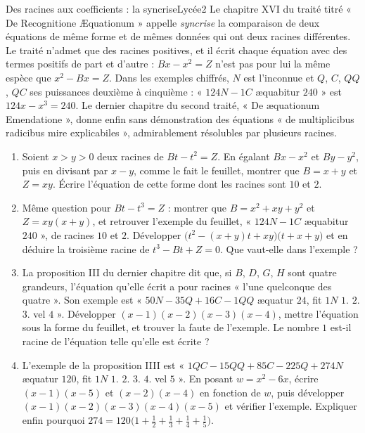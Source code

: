 \documentclass[11pt,a4paper]{article}
\begin{document}
\begin{exercice}{Des racines aux coefficients : la syncrise}{Lycée}{2}
Le chapitre XVI du traité titré « De Recognitione Æquationum » appelle
\emph{syncrise} la comparaison de deux équations de même forme et de mêmes
données qui ont deux racines différentes. Le traité n'admet que des racines
positives, et il écrit chaque équation avec des termes positifs de part et
d'autre : $Bx - x^2 = Z$ n'est pas pour lui la même espèce que $x^2 - Bx = Z$.
Dans les exemples chiffrés, $N$ est l'inconnue et $Q$, $C$, $QQ$, $QC$ ses
puissances deuxième à cinquième : « $124N - 1C$ æquabitur $240$ » est
$124x - x^3 = 240$. Le dernier chapitre du second traité, « De æquationum
Emendatione », donne enfin sans démonstration des équations « de multiplicibus
radicibus mire explicabiles », admirablement résolubles par plusieurs racines.
\begin{enumerate}
\item Soient $x > y > 0$ deux racines de $Bt - t^2 = Z$. En égalant $Bx - x^2$
  et $By - y^2$, puis en divisant par $x - y$, comme le fait le feuillet, montrer
  que $B = x + y$ et $Z = xy$. Écrire l'équation de cette forme dont les racines
  sont $10$ et $2$.
\item Même question pour $Bt - t^3 = Z$ : montrer que $B = x^2 + xy + y^2$ et
  $Z = xy(x + y)$, et retrouver l'exemple du feuillet, « $124N - 1C$ æquabitur
  $240$ », de racines $10$ et $2$. Développer
  $\bigl(t^2 - (x+y)t + xy\bigr)\bigl(t + x + y\bigr)$ et en déduire la troisième
  racine de $t^3 - Bt + Z = 0$. Que vaut-elle dans l'exemple ?
\item La proposition III du dernier chapitre dit que, si $B$, $D$, $G$, $H$ sont
  quatre grandeurs, l'équation qu'elle écrit a pour racines « l'une quelconque des
  quatre ». Son exemple est « $50N - 35Q + 16C - 1QQ$ æquatur $24$, fit $1N$ $1$.
  $2$. $3$. vel $4$ ». Développer $(x-1)(x-2)(x-3)(x-4)$, mettre l'équation sous
  la forme du feuillet, et trouver la faute de l'exemple. Le nombre $1$ est-il
  racine de l'équation telle qu'elle est écrite ?
\item L'exemple de la proposition IIII est « $1QC - 15QQ + 85C - 225Q + 274N$
  æquatur $120$, fit $1N$ $1$. $2$. $3$. $4$. vel $5$ ». En posant $w = x^2 - 6x$,
  écrire $(x-1)(x-5)$ et $(x-2)(x-4)$ en fonction de $w$, puis développer
  $(x-1)(x-2)(x-3)(x-4)(x-5)$ et vérifier l'exemple. Expliquer enfin pourquoi
  $274 = 120\bigl(1 + \frac12 + \frac13 + \frac14 + \frac15\bigr)$.
\end{enumerate}
\end{exercice}
\end{document}
